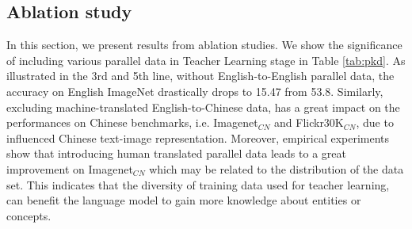 \subsection{Ablation study}
\label{sec5-3}
In this section, we present results from ablation studies. We show the significance of including various parallel data in Teacher Learning stage in Table \ref{tab:pkd}. As illustrated in the 3rd and 5th line, without English-to-English parallel data, the accuracy on English ImageNet drastically drops to 15.47 from 53.8. Similarly, excluding machine-translated English-to-Chinese data, has a great impact on the performances on Chinese benchmarks, i.e. Imagenet$_{CN}$ and Flickr30K$_{CN}$, due to influenced Chinese text-image representation. Moreover, empirical experiments show that introducing human translated parallel data leads to a great improvement on Imagenet$_{CN}$ which may be related to the distribution of the data set. This indicates that the diversity of training data used for teacher learning, can benefit the language model to gain more knowledge about entities or concepts.


